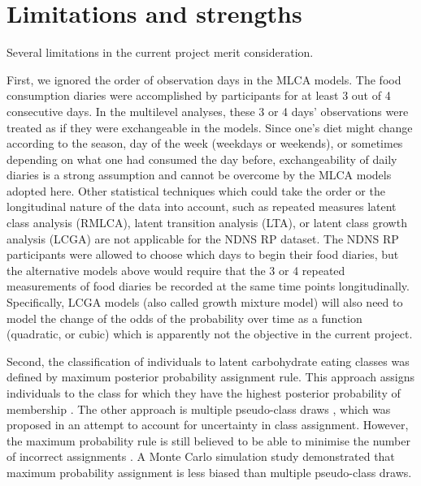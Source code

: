\section{Limitations and strengths}
 
Several limitations in the current project merit consideration.  

First, we ignored the order of observation days in the MLCA models. The food consumption diaries were accomplished by participants for at least 3 out of 4 consecutive days. In the multilevel analyses, these 3 or 4 days' observations were treated as if they were exchangeable in the models. Since one's diet might change according to the season, day of the week (weekdays or weekends), or sometimes depending on what one had consumed the day before, exchangeability of daily diaries is a strong assumption and cannot be overcome by the MLCA models adopted here. Other statistical techniques which could take the order or the longitudinal nature of the data into account, such as repeated measures latent class analysis (RMLCA), latent transition analysis (LTA)\parencite{collins2010latent}, or latent class growth analysis (LCGA) \parencite{davidian2008growth,jung2008introduction,andruff2009latent} are not applicable for the NDNS RP dataset. The NDNS RP participants were allowed to choose which days to begin their food diaries, but the alternative models above would require that the 3 or 4 repeated measurements of food diaries be recorded at the same time points longitudinally. Specifically, LCGA models (also called growth mixture model) will also need to model the change of the odds of the probability over time as a function (quadratic, or cubic) which is apparently not the objective in the current project.


Second, the classification of individuals to latent carbohydrate eating classes was defined by maximum posterior probability assignment rule. This approach assigns individuals to the class for which they have the highest posterior probability of membership \parencite{nagin2005group}. The other approach is multiple pseudo-class draws \parencite{wang2005residual}, which was proposed in an attempt to account for uncertainty in class assignment. However, the maximum probability rule is still believed to be able to minimise the number of incorrect assignments \parencite{goodman20071}. A Monte Carlo simulation study \parencite{bray2015eliminating} demonstrated that maximum probability assignment is less biased than multiple pseudo-class draws. 

